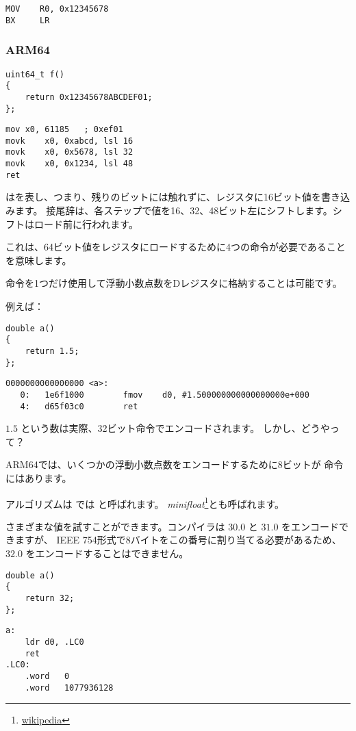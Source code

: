 \begin{lstlisting}[style=customasmARM]
MOV    R0, 0x12345678
BX     LR
\end{lstlisting}

\subsubsection{ARM64}

\begin{lstlisting}[style=customc]
uint64_t f()
{
	return 0x12345678ABCDEF01;
};
\end{lstlisting}

\begin{lstlisting}[caption=GCC 4.9.1 -O3,style=customasmARM]
mov	x0, 61185   ; 0xef01
movk	x0, 0xabcd, lsl 16
movk	x0, 0x5678, lsl 32
movk	x0, 0x1234, lsl 48
ret
\end{lstlisting}

はを表し、つまり、残りのビットには触れずに、レジスタに16ビット値を書き込みます。
接尾辞は、各ステップで値を16、32、48ビット左にシフトします。シフトはロード前に行われます。

これは、64ビット値をレジスタにロードするために4つの命令が必要であることを意味します。


命令を1つだけ使用して浮動小数点数をDレジスタに格納することは可能です。

例えば：

\begin{lstlisting}[style=customc]
double a()
{
	return 1.5;
};
\end{lstlisting}

\begin{lstlisting}[caption=GCC 4.9.1 -O3 + objdump,style=customasmARM]
0000000000000000 <a>:
   0:   1e6f1000        fmov    d0, #1.500000000000000000e+000
   4:   d65f03c0        ret
\end{lstlisting}

$1.5$ という数は実際、32ビット命令でエンコードされます。
しかし、どうやって？

ARM64では、いくつかの浮動小数点数をエンコードするために8ビットが  命令にはあります。

アルゴリズムは \ARMSixFourRefURL では と呼ばれます。
\emph{minifloat}\footnote{\href{http://en.wikipedia.org/wiki/Minifloat}{wikipedia}}とも呼ばれます。

さまざまな値を試すことができます。コンパイラは $30.0$ と $31.0$ をエンコードできますが、
IEEE 754形式で8バイトをこの番号に割り当てる必要があるため、 $32.0$ をエンコードすることはできません。

\begin{lstlisting}[style=customc]
double a()
{
	return 32;
};
\end{lstlisting}

\begin{lstlisting}[caption=GCC 4.9.1 -O3,style=customasmARM]
a:
	ldr	d0, .LC0
	ret
.LC0:
	.word	0
	.word	1077936128
\end{lstlisting}
